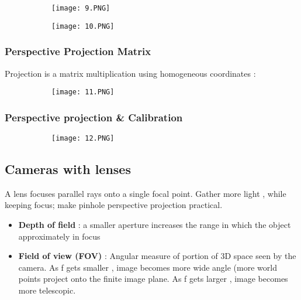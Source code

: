 \documentclass{article}
\begin{document}
\begin{figure}[ht!]
  \centering
  \begin{subfigure}[b]{0.4\linewidth}
    \texttt{[image: 9.PNG]}
  \end{subfigure}
  \begin{subfigure}[b]{0.4\textwidth}
         \centering
         \texttt{[image: 10.PNG]}
     \end{subfigure}
\end{figure}



\subsubsection{Perspective Projection Matrix}
Projection is a matrix multiplication using homogeneous coordinates : 

\begin{figure}[ht!]
  \centering
  \begin{subfigure}[b]{0.4\linewidth}
    \texttt{[image: 11.PNG]}
  \end{subfigure}
\end{figure}



\subsubsection{Perspective projection \& Calibration}

\begin{figure}[ht!]
  \centering
  \begin{subfigure}[b]{0.4\linewidth}
    \texttt{[image: 12.PNG]}
  \end{subfigure}
\end{figure}




\subsection{Cameras with lenses}

A lens focuses parallel rays onto a single focal point. Gather more light , while keeping focus; make pinhole perspective projection practical.

\begin{itemize}
    \item \textbf{Depth of field} : a smaller aperture increases the range in which the object approximately in focus
    \item \textbf{Field of view (FOV)} : Angular measure of portion of 3D space seen by the camera.
    As f gets smaller , image becomes more wide angle (more world points project onto the finite image plane. As f gets larger , image becomes more telescopic.
\end{itemize}
\end{document}
